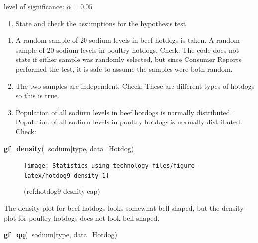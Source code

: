 \documentclass[
]{book}
\newenvironment{Shaded}{\begin{snugshade}}{\end{snugshade}}
\newcommand{\DataTypeTok}[1]{\textcolor[rgb]{0.13,0.29,0.53}{#1}}
\newcommand{\KeywordTok}[1]{\textcolor[rgb]{0.13,0.29,0.53}{\textbf{#1}}}
\newcommand{\NormalTok}[1]{#1}
\newcommand{\OperatorTok}[1]{\textcolor[rgb]{0.81,0.36,0.00}{\textbf{#1}}}
\providecommand{\tightlist}{%
  \setlength{\itemsep}{0pt}\setlength{\parskip}{0pt}}
\begin{document}
level of significance: \(\alpha=0.05\)

\begin{enumerate}
\def\labelenumi{\arabic{enumi}.}
\setcounter{enumi}{2}
\tightlist
\item
  State and check the assumptions for the hypothesis test
\end{enumerate}

\begin{enumerate}
\def\labelenumi{\alph{enumi}.}
\item
  A random sample of 20 sodium levels in beef hotdogs is taken. A random sample of 20 sodium levels in poultry hotdogs. Check: The code does not state if either sample was randomly selected, but since Consumer Reports performed the test, it is safe to assume the samples were both random.
\item
  The two samples are independent. Check: These are different types of hotdogs so this is true.
\item
  Population of all sodium levels in beef hotdogs is normally distributed. Population of all sodium levels in poultry hotdogs is normally distributed. Check:
\end{enumerate}



\begin{Shaded}
\begin{Highlighting}[]
\KeywordTok{gf_density}\NormalTok{(}\OperatorTok{~}\NormalTok{sodium}\OperatorTok{|}\NormalTok{type, }\DataTypeTok{data=}\NormalTok{Hotdog)}
\end{Highlighting}
\end{Shaded}

\begin{figure}
\texttt{[image: Statistics\_using\_technology\_files/figure-latex/hotdog9-density-1]} \caption{(ref:hotdog9-desnity-cap)}\label{fig:hotdog9-density}
\end{figure}

The density plot for beef hotdogs looks somewhat bell shaped, but the density plot for poultry hotdogs does not look bell shaped.



\begin{Shaded}
\begin{Highlighting}[]
\KeywordTok{gf_qq}\NormalTok{(}\OperatorTok{~}\NormalTok{sodium}\OperatorTok{|}\NormalTok{type, }\DataTypeTok{data=}\NormalTok{Hotdog)}
\end{Highlighting}
\end{Shaded}
\end{document}
